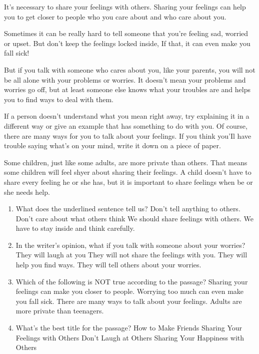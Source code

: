 \documentclass{ExamJHSEngl}
\begin{document}
It's necessary to share your feelings with others. Sharing your feelings can help you to get closer to people who you care about and who care about you.

Sometimes it can be really hard to tell someone that you're feeling sad, worried or upset. But don't keep the feelings locked inside, If that, it can even make you fall sick!

But if you talk with someone who cares about you, like your parents, you will not be all alone with your problems or worries. It doesn't mean your problems and worries go off, but at least someone else knows what your troubles are and helps you to find ways to deal with them.

If a person doesn't understand what you mean right away, try explaining it in a different way or give an example that has something to do with you. Of course, there are many ways for you to talk about your feelings. If you think you'Il have trouble saying what's on your mind, write it down on a piece of paper.

Some children, just like some adults, are more private than others. That means some children will feel shyer about sharing their feelings. A child doesn't have to share every feeling he or she has, but it is important to share feelings when be or she needs help.

\begin{enumerate}[resume,ref={\arabic*},labelsep=-0.1em]

  \item[\choice{C}] What does the underlined sentence tell us?
  \options
    {Don't tell anything to others.}
    {Don't care about what others think}
    {We should share feelings with others.}
    {We have to stay inside and think carefully.}

  \item[\choice{C}] In the writer's opinion, what if you talk with someone about your worries?
  \options
    {They will laugh at you}
    {They will not share the feelings with you.}
    {They will help you find ways.}
    {They will tell others about your worries.}

  \item[\choice{D}] Which of the following is NOT true according to the passage?
  \options
    {Sharing your feelings can make you closer to people.}
    {Worrying too much can even make you fall sick.}
    {There are many ways to talk about your feelings.}
    {Adults are more private than teenagers.}

  \item[\choice{B}] What's the best title for the passage?
  \options
    {How to Make Friends}
    {Sharing Your Feelings with Others}
    {Don't Laugh at Others}
    {Sharing Your Happiness with Others}

\end{enumerate}
\end{document}
